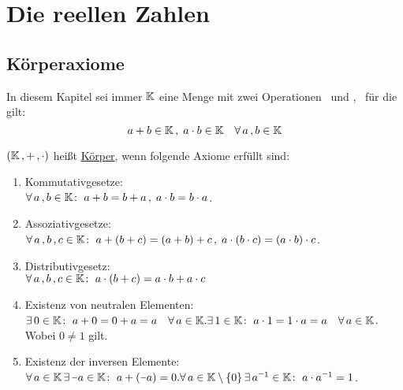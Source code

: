 \documentclass[../ana1.tex]{subfiles}
\begin{document}
\setcounter{section}{2}

\section{Die reellen Zahlen}

\subsection{Körperaxiome}
\begin{prosa}
	In diesem Kapitel sei immer \(\mathbb{K}  \) eine Menge mit zwei Operationen \gqq{\(+  \)} \, und 
	\gqq{\(\cdot \)}, \, für die gilt:
	\[a + b \in \mathbb{K} \operatorname{,}  \; a \cdot b \in \mathbb{K} \quad \forall \, a \operatorname{,} b \in \mathbb{K}  \]
\end{prosa}

\begin{defi}[Körperaxiome]
	\((\mathbb{K} \operatorname{,} + \operatorname{,} \cdot) \) heißt \underline{Körper}, wenn folgende Axiome erfüllt sind:
	\begin{enumerate}[label= (K\arabic*)]
		\item\label{ax:K1}Kommutativgesetze: \\
			  \(\forall \, a \operatorname{,} b \in \mathbb{K} \colon \; a+b=b+a \operatorname{,}  \; a \cdot b = b \cdot a \).
		\item\label{ax:K2}Assoziativgesetze: \\
			  \(\forall \, a \operatorname{,} b \operatorname{,} c \in \mathbb{K} \colon \; a+(b+c) = (a+b)+c \operatorname{,}  \; a \cdot (b \cdot c) = (a \cdot b)\cdot c \).
		\item\label{ax:K3}Distributivgesetz: \\
			  \(\forall \, a \operatorname{,} b \operatorname{,} c \in \mathbb{K} \colon \; a \cdot (b+c) = a \cdot b + a \cdot c \)
		\item\label{ax:K4}Existenz von neutralen Elementen: \\
			  \(\exists \, 0 \in \mathbb{K} \colon \; a + 0 = 0 + a = a \quad \forall \, a \in \mathbb{K}. \\
				\exists \, 1 \in \mathbb{K} \colon \; a \cdot 1 = 1 \cdot a = a \quad \forall \, a \in \mathbb{K} \). \\
			  Wobei \(0 \neq 1 \) gilt. 
		\item\label{ax:K5}Existenz der inversen Elemente: \\
		      \(\forall \, a \in \K \, \exists  \, \minus a \in \K \colon \; a + (\minus a) = 0. \\
			    \forall \, a \in \K \setminus \set{0} \, \exists \, a^{\minus 1} \in \K \colon \; a \cdot a^{\minus 1} = 1 \). \\
	\end{enumerate}
\end{defi}
\end{document}
